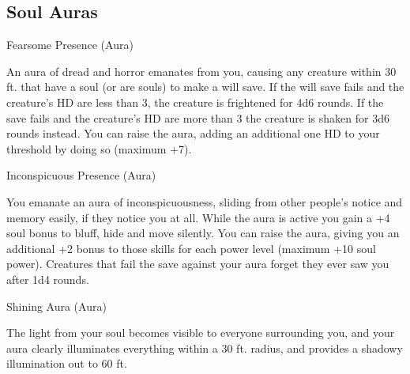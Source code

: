 \subsection{Soul Auras}

\begin{soulpower}{Fearsome Presence (Aura)}
  \components{-}

  An aura of dread and horror emanates from you, causing any creature within
  30 ft. that have a soul (or are souls) to make a will save. If the will save
  fails and the creature's HD are less than 3, the creature is frightened for
  4d6 rounds. If the save fails and the creature's HD are more than 3 the
  creature is shaken for 3d6 rounds instead. You can raise the aura, adding an
  additional one HD to your threshold by doing so (maximum +7).
\end{soulpower}

\begin{soulpower}{Inconspicuous Presence (Aura)}

  \components{-}
  \rangepersonal

  You emanate an aura of inconspicuousness, sliding from other people's notice
  and memory easily, if they notice you at all. While the aura is active you
  gain a +4 soul bonus to bluff, hide and move silently. You can raise the
  aura, giving you an additional +2 bonus to those skills for each power level
  (maximum +10 soul power). Creatures that fail the save against your aura
  forget they ever saw you after 1d4 rounds.
\end{soulpower}

\begin{soulpower}{Shining Aura (Aura)}
  \components{-}
  \rangepersonal

  The light from your soul becomes visible to everyone surrounding you, and
  your aura clearly illuminates everything within a 30 ft. radius, and
  provides a shadowy illumination out to 60 ft.
\end{soulpower}
